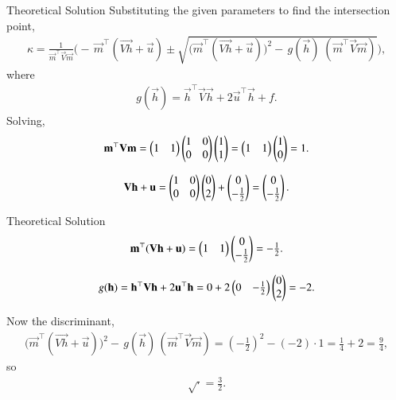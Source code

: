 \documentclass{beamer}
\begin{document}
\begin{frame}{Theoretical Solution}
Substituting the given parameters to find the intersection point,
\begin{align}
\kappa=\frac{1}{\vec{m}^{\top}\vec{V}\vec{m}}\Big(
-\,\vec{m}^{\top}(\vec{Vh}+\vec{u})
\pm
\sqrt{\big(\vec{m}^{\top}(\vec{Vh}+\vec{u})\big)^{2}
-\,g(\vec{h})\;(\vec{m}^{\top}\vec{V}\vec{m})}
\Big),
\end{align}
where 
\begin{align}
g(\vec{h})=\vec{h}^{\top}\vec{V}\vec{h}+2\vec{u}^{\top}\vec{h}+f.
\end{align}
Solving,
\begin{align}
\mathbf{m}^{\top}\mathbf{V}\mathbf{m}
=\begin{pmatrix}1 & 1\end{pmatrix}\begin{pmatrix}1 & 0\\0 & 0\end{pmatrix}\begin{pmatrix}1\\1\end{pmatrix}
=\begin{pmatrix}1 & 1\end{pmatrix}\begin{pmatrix}1\\0\end{pmatrix}=1.
\end{align}

\begin{align}
\mathbf{Vh}+\mathbf{u}
=\begin{pmatrix}1 & 0\\0 & 0\end{pmatrix}\begin{pmatrix}0\\2\end{pmatrix}
+\begin{pmatrix}0\\-\tfrac{1}{2}\end{pmatrix}
=\begin{pmatrix}0\\-\tfrac{1}{2}\end{pmatrix}.
\end{align}

\end{frame}

\begin{frame}{Theoretical Solution}
\begin{align}
\mathbf{m}^{\top}(\mathbf{Vh}+\mathbf{u})
=\begin{pmatrix}1 & 1\end{pmatrix}\begin{pmatrix}0\\-\tfrac{1}{2}\end{pmatrix}=-\tfrac{1}{2}.
\end{align}

\begin{align}
g(\mathbf{h})
=\mathbf{h}^{\top}\mathbf{V}\mathbf{h}+2\mathbf{u}^{\top}\mathbf{h}
=0+2\begin{pmatrix}0 & -\tfrac{1}{2}\end{pmatrix}\begin{pmatrix}0\\2\end{pmatrix}=-2.
\end{align}

Now the discriminant,
\begin{align}
\big(\vec{m}^{\top}(\vec{Vh}+\vec{u})\big)^{2}
-\,g(\vec{h})\,(\vec{m}^{\top}\vec{V}\vec{m})
=\left(-\tfrac{1}{2}\right)^{2}-(-2)\cdot 1
=\tfrac{1}{4}+2=\tfrac{9}{4},
\end{align}
so 
\begin{align}
\sqrt{\cdot}=\tfrac{3}{2}.
\end{align}

\end{frame}
\end{document}
